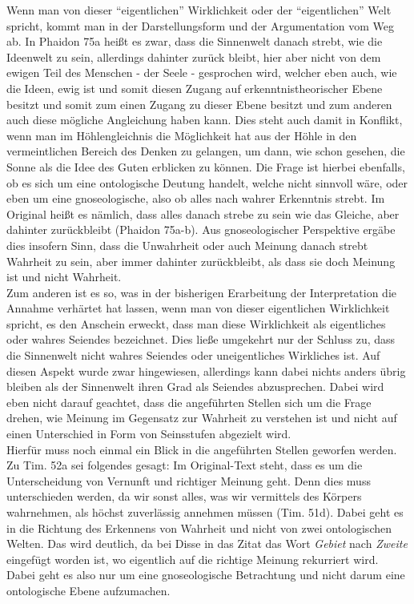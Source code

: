Wenn man von dieser \enquote{eigentlichen} Wirklichkeit oder der \enquote{eigentlichen} Welt spricht, kommt man in der Darstellungsform und der Argumentation vom Weg ab. In Phaidon 75a heißt es zwar, dass die Sinnenwelt danach strebt, wie die Ideenwelt zu sein, allerdings dahinter zurück bleibt, hier aber nicht von dem ewigen Teil des Menschen - der Seele - gesprochen wird, welcher eben auch, wie die Ideen, ewig ist und somit diesen Zugang auf erkenntnistheorischer Ebene besitzt und somit zum einen Zugang zu dieser Ebene besitzt und zum anderen auch diese mögliche Angleichung haben kann. Dies steht auch damit in Konflikt, wenn man im Höhlengleichnis die Möglichkeit hat aus der Höhle in den vermeintlichen Bereich des Denken zu gelangen, um dann, wie schon gesehen, die Sonne als die Idee des Guten erblicken zu können. Die Frage ist hierbei ebenfalls, ob es sich um eine ontologische Deutung handelt, welche nicht sinnvoll wäre, oder eben um eine gnoseologische, also ob alles nach wahrer Erkenntnis strebt. Im Original heißt es nämlich, dass alles danach strebe zu sein wie das Gleiche, aber dahinter zurückbleibt (Phaidon 75a-b). Aus gnoseologischer Perspektive ergäbe dies insofern Sinn, dass die Unwahrheit oder auch Meinung danach strebt Wahrheit zu sein, aber immer dahinter zurückbleibt, als dass sie doch Meinung ist und nicht Wahrheit.\\
Zum anderen ist es so, was in der bisherigen Erarbeitung der Interpretation die Annahme verhärtet hat lassen, wenn man von dieser eigentlichen Wirklichkeit spricht, es den Anschein erweckt, dass man diese Wirklichkeit als eigentliches oder wahres Seiendes bezeichnet. Dies ließe umgekehrt nur der Schluss zu, dass die Sinnenwelt nicht wahres Seiendes oder uneigentliches Wirkliches ist. Auf diesen Aspekt wurde zwar hingewiesen, allerdings kann dabei nichts anders übrig bleiben als der Sinnenwelt ihren Grad als Seiendes abzusprechen. Dabei wird eben nicht darauf geachtet, dass die angeführten Stellen sich um die Frage drehen, wie Meinung im Gegensatz zur Wahrheit zu verstehen ist und nicht auf einen Unterschied in Form von Seinsstufen abgezielt wird.\\ 
Hierfür muss noch einmal ein Blick in die angeführten Stellen geworfen werden. 
Zu Tim. 52a sei folgendes gesagt: Im Original-Text steht, dass es um die Unterscheidung von Vernunft und richtiger Meinung geht. Denn dies muss unterschieden werden, da wir sonst alles, was wir vermittels des Körpers wahrnehmen, als höchst zuverlässig annehmen müssen (Tim. 51d). Dabei geht es in die Richtung des Erkennens von Wahrheit und nicht von zwei ontologischen Welten. Das wird deutlich, da bei Disse in das Zitat das Wort \emph{Gebiet} nach \emph{Zweite} eingefügt worden ist, wo eigentlich auf die richtige Meinung rekurriert wird. Dabei geht es also nur um eine gnoseologische Betrachtung und nicht darum eine ontologische Ebene aufzumachen.\\

